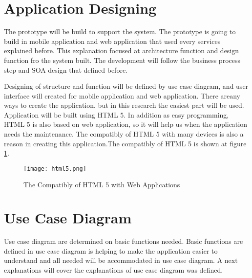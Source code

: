 \section{Application Designing}
The prototype will be build to support the system. The prototype is going to build in mobile application and web application that used every services explained before. This explanation focused at architecture function and design function fro the system built. The development will follow the business process step and SOA design that defined before.\par  
Designing of structure and function will be defined by use case diagram, and user interface will created for mobile application and web application. There areany ways to create the application, but in this research the easiest part will be used. Application will be built using HTML 5. In addition as easy programming, HTML 5 is also based on web application, so it will help us when the application needs the maintenance. The compatibly of HTML 5 with many devices is also a reason in creating this application.The compatibly of HTML 5 is shown at figure \ref{fig:html5}. \par 

\begin{figure}[H]
\centering
\texttt{[image: html5.png]}
\label{fig:html5}
\caption{The Compatibly of HTML 5 with Web Applications \cite{HTML5}}
\end{figure}

\section{Use Case Diagram}
Use case diagram are determined on basic functions needed. Basic functions are defined in use case diagram is helping to make the application easier to understand and all needed will be accommodated in use case diagram. A next explanations will cover the explanations of use case diagram was defined.

